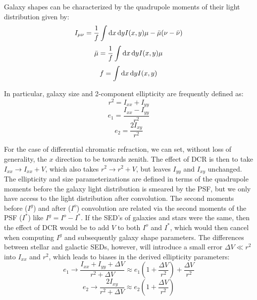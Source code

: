 \documentclass[apj]{emulateapj}
\begin{document}
Galaxy shapes can be characterized by the quadrupole moments of their
light distribution given by:
\begin{equation}
  I_{\mu \nu} = \frac{1}{f}\int{\dif{x} \dif{y} I(x,y)\mu - \bar{\mu}(\nu - \bar{\nu})}
\end{equation}
\begin{equation}
  \bar{\mu} = \frac{1}{f}\int{\dif{x} \dif{y} I(x,y)\mu}
\end{equation}
\begin{equation}
  f = \int{\dif{x} \dif{y} I(x,y)}
\end{equation}

In particular, galaxy size and 2-component ellipticity are frequently defined as:
\begin{equation}
  r^2 = I_{xx} + I_{yy}
\end{equation}
\begin{equation}
  e_1 = \frac{I_{xx} - I_{yy}}{r^2}
\end{equation}
\begin{equation}
  e_2 = \frac{2 I_{xy}}{r^2}
\end{equation}

For the case of differential chromatic refraction, we can set, without
loss of generality, the $x$ direction to be towards zenith.  The
effect of DCR is then to take $I_{xx} \rightarrow I_{xx} + V$, which
also takes $r^2 \rightarrow r^2 + V$, but leaves $I_{yy}$ and $I_{xy}$
unchanged.  The ellipticity and size parameterizations are defined in
terms of the quadrupole moments before the galaxy light distribution
is smeared by the PSF, but we only have access to the light
distribution after convolution.  The second moments before ($I^g$) and
after ($I^o$) convolution are related via the second moments of the
PSF ($I^*$) like $I^g = I^o - I^*$.  If the SED's of galaxies and
stars were the same, then the effect of DCR would be to add $V$ to
both $I^o$ and $I^*$, which would then cancel when computing $I^g$ and
subsequently galaxy shape parameters.  The differences between stellar
and galactic SEDs, however, will introduce a small error $\Delta V \ll
r^2$ into $I_{xx}$ and $r^2$, which leads to biases in the derived
ellipticity parameters:
\begin{equation}
  e_1 \rightarrow \frac{I_{xx} + I_{yy} + \Delta V}{r^2 + \Delta V} \approx e_1 \left(1 + \frac{\Delta V}{r^2}\right) + \frac{\Delta V}{r^2}
\end{equation}
\begin{equation}
  e_2 \rightarrow \frac{2 I_{xy}}{r^2 + \Delta V} \approx e_2 \left(1 + \frac{\Delta V}{r^2}\right)
\end{equation}
\end{document}
